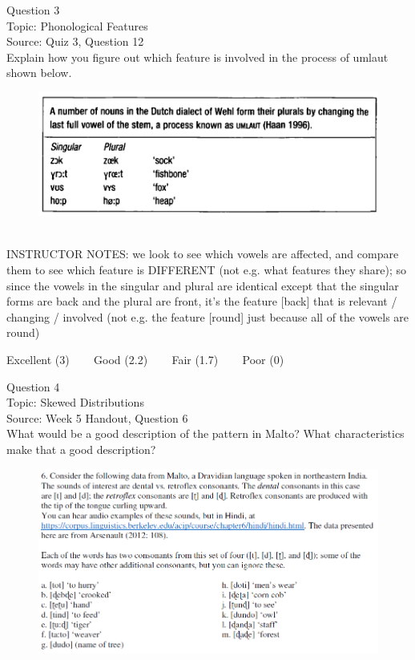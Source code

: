 \documentclass[12pt]{article}
\begin{document}
{\large Question 3}\\

Topic: Phonological Features\\
Source: Quiz 3, Question 12\\

Explain how you figure out which feature is involved in the process of umlaut shown below.\\

\begin{figure}[H]
\includegraphics{../images/dutch.png}
\end{figure}

~\\
INSTRUCTOR NOTES: we look to see which vowels are affected, and compare them to see which feature is DIFFERENT (not e.g. what features they share); so since the vowels in the singular and plural are identical except that the singular forms are back and the plural are front, it's the feature [back] that is relevant / changing / involved (not e.g. the feature [round] just because all of the vowels are round)


\vfill
Excellent (3) ~~~ Good (2.2) ~~~ Fair (1.7) ~~~ Poor (0)
\newpage

{\large Question 4}\\

Topic: Skewed Distributions\\
Source: Week 5 Handout, Question 6\\

What would be a good description of the pattern in Malto? What characteristics make that a good description?\\

\begin{figure}[H]
\includegraphics{../images/malto.png}
\end{figure}
\end{document}
